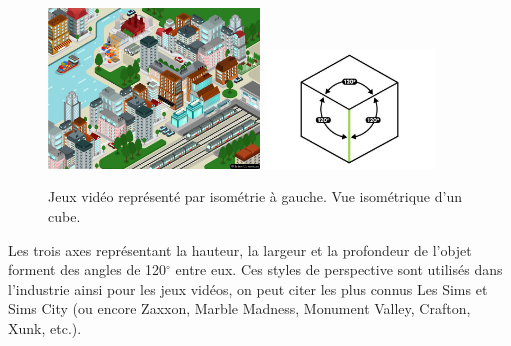 \documentclass[
	11pt, %
	fleqn, %
	a4paper, %
]{LegrandOrangeBook}
\begin{document}
\begin{figure}[H] %
	\centering %
	\includegraphics[width=0.5\textwidth]{Images/iso.jpg} 
    \includegraphics[width=0.4\textwidth]{Images/iso2.jpg} 
	\caption{Jeux vidéo représenté par isométrie à gauche. Vue isométrique d'un cube.}
	\label{iso} %
\end{figure}

Les trois axes représentant la hauteur, la largeur et la profondeur de l’objet forment des angles de 120$^{\circ}$ entre eux. Ces styles de perspective sont utilisés dans l'industrie ainsi pour les jeux vidéos, on peut citer les plus connus Les Sims et Sims City (ou encore Zaxxon, Marble Madness, Monument Valley, Crafton, Xunk, etc.).





\chapterspaceabove{6.25cm} %
\chapterspacebelow{7.5cm} %
\end{document}
